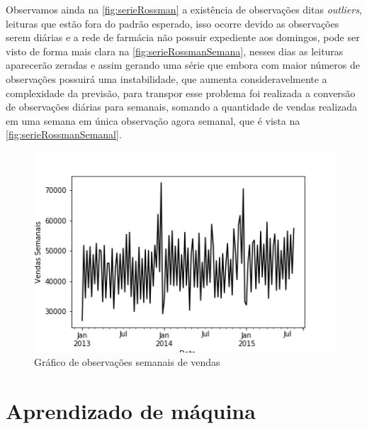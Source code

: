 \documentclass[
	12pt,
	oneside,
	a4paper,
	english,
	brazil
]{abntex2}
\begin{document}
Observamos ainda na \autoref{fig:serieRossman} a existência de observações ditas 
\textit{outliers}, leituras que estão fora do padrão esperado, isso ocorre 
devido as observações serem diárias e a rede de farmácia não possuir expediente 
aos domingos, pode ser visto de forma mais clara na 
\autoref{fig:serieRossmanSemana}, nesses dias as leituras aparecerão zeradas e 
assim gerando uma série que embora com maior números de observações possuirá uma 
instabilidade, que aumenta consideravelmente a complexidade da previsão, para 
transpor esse problema foi realizada a conversão de observações diárias para 
semanais, somando a quantidade de vendas realizada em uma semana em única 
observação agora semanal, que é vista na \autoref{fig:serieRossmanSemanal}.

\begin{figure}[ht]
    \centering
    \caption{Gráfico de observações semanais de 
    vendas}\label{fig:serieRossmanSemanal}
    \includegraphics[width=.6\textwidth]{images/graficoRossmanSemanal.png}
\end{figure}

\section{Aprendizado de máquina}
\end{document}

